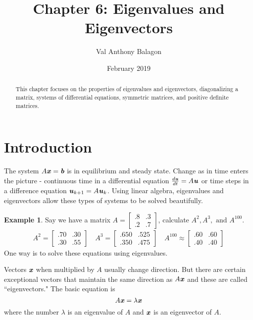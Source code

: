 \documentclass[12pt, letterpaper]{article}
\author{Val Anthony Balagon}
\date{February 2019}
\title{Chapter 6: Eigenvalues and Eigenvectors}
\newcommand{\V}[1]{\textbf{\textit{#1}}}
\newcommand{\DefinitionSpace}{\vspace{15px}}
\theoremstyle{definition}
\newtheorem{example}{Example}
\begin{document}
	\maketitle
	\begin{abstract}
		This chapter focuses on the properties of eigenvalues and eigenvectors, diagonalizing a matrix, systems of differential equations, symmetric matrices, and positive definite matrices.
	\end{abstract}

\section{Introduction}
The system $A\V{x} = \V{b}$ is in equilibrium and steady state. Change as in time enters the picture - continuous time in a differential equation $\frac{d\V{u}}{dt} = A\V{u}$ or time steps in a difference equation $\V{u}_{k+1} = A\V{u}_k$. Using linear algebra, eigenvalues and eigenvectors allow these types of systems to be solved beautifully.

	\DefinitionSpace
	\begin{example}
		Say we have a matrix $A = \begin{bmatrix}
									.8 & .3 \\ .2 & .7
									\end{bmatrix}$, calculate $A^2, A^3, \text{ and } A^100$.
				\begin{gather*}
					A^2 = \begin{bmatrix}.70 & .30 \\ .30 & .55\end{bmatrix} \quad A^3 = \begin{bmatrix}.650 & .525 \\ .350 & .475\end{bmatrix} \quad A^{100} \approx \begin{bmatrix}.60 & .60 \\ .40 & .40\end{bmatrix}
				\end{gather*}
		\noindent One way is to solve these equations using eigenvalues.
	\end{example}
	\DefinitionSpace
Vectors $\V{x}$ when multiplied by $A$ usually change direction. But there are certain exceptional vectors that maintain the same direction as $A\V{x}$ and these are called ``eigenvectors." The basic equation is \begin{equation}A \V{x} = \lambda \V{x} \label{eig_prob} \end{equation} where the number $\lambda$ is an eigenvalue of $A$ and $\V{x}$ is an eigenvector of $A$.
\end{document}
